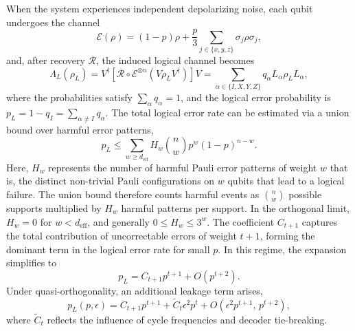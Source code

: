 \documentclass{iopjournal}
\theoremstyle{thmstyleone}%
\theoremstyle{thmstyletwo}%
\theoremstyle{thmstylethree}%
\begin{document}
When the system experiences independent depolarizing noise, each qubit undergoes the channel
\begin{equation}
\mathcal{E}(\rho)=(1-p)\rho+\frac{p}{3}\sum_{j\in\{x,y,z\}}\sigma_j\rho\sigma_j, \label{depo noise}
\end{equation}
and, after recovery $\mathcal{R}$, the induced logical channel becomes
\begin{equation}
\Lambda_L(\rho_L)=V^\dagger[\mathcal{R}\!\circ\!\mathcal{E}^{\otimes n}(V\rho_LV^\dagger)]V
=\sum_{\alpha\in\{I,X,Y,Z\}}q_\alpha L_\alpha\rho_LL_\alpha, \label{recovery}
\end{equation}
where the probabilities satisfy $\sum_\alpha q_\alpha=1$, and the logical error probability is 
$p_L=1-q_I=\sum_{\alpha\neq I}q_\alpha$. The total logical error rate can be estimated via a union bound over harmful error patterns,
\begin{equation}
p_L \le \sum_{w\ge d_{\mathrm{eff}}} H_w\binom{n}{w}p^w(1-p)^{n-w}. \label{error rate}
\end{equation}
Here, $H_w$ represents the number of harmful Pauli error patterns of weight $w$ that is, the distinct non-trivial Pauli configurations on $w$ qubits that lead to a logical failure. The union bound therefore counts harmful events as $\binom{n}{w}$ possible supports multiplied by $H_w$ harmful patterns per support. In the orthogonal limit, $H_w=0$ for $w<d_{\mathrm{eff}}$, and generally $0\le H_w\le 3^w$.
The coefficient $C_{t+1}$ captures the total contribution of uncorrectable errors of weight $t+1$, forming the dominant term in the logical error rate for small $p$. In this regime, the expansion simplifies to
\begin{equation}
p_L = C_{t+1}p^{t+1} + O(p^{t+2}).
\end{equation}
Under quasi-orthogonality, an additional leakage term arises,
\begin{equation}
p_L(p,\epsilon) = C_{t+1}p^{t+1} + \tilde{C}_t\epsilon^2p^{t}
+ O(\epsilon^2p^{t+1},\, p^{t+2}), \label{PL with Quasi}
\end{equation}
where $\tilde{C}_t$ reflects the influence of cycle frequencies and decoder tie-breaking.
\end{document}
